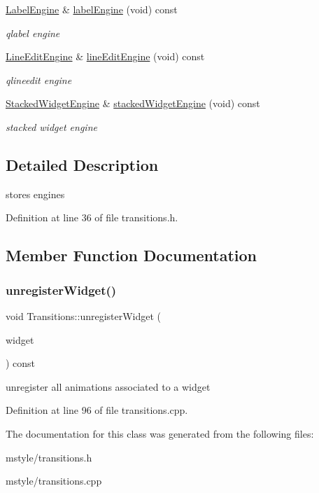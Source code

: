 \begin{DoxyCompactItemize}
\hyperlink{class_label_engine}{Label\+Engine} \& \hyperlink{class_transitions_a4b36d0bb18887994011b9ad2b3c0fbe8}{label\+Engine} (void) const
\begin{DoxyCompactList}\small\item\em qlabel engine \end{DoxyCompactList}\item 
\mbox{\label{class_transitions_a90a66821499f04f275c5bf2e0ea54f78}} 
\hyperlink{class_line_edit_engine}{Line\+Edit\+Engine} \& \hyperlink{class_transitions_a90a66821499f04f275c5bf2e0ea54f78}{line\+Edit\+Engine} (void) const
\begin{DoxyCompactList}\small\item\em qlineedit engine \end{DoxyCompactList}\item 
\mbox{\label{class_transitions_a2fc5ec8500f6851cf930e36dc45467b5}} 
\hyperlink{class_stacked_widget_engine}{Stacked\+Widget\+Engine} \& \hyperlink{class_transitions_a2fc5ec8500f6851cf930e36dc45467b5}{stacked\+Widget\+Engine} (void) const
\begin{DoxyCompactList}\small\item\em stacked widget engine \end{DoxyCompactList}\end{DoxyCompactItemize}


\subsection{Detailed Description}
stores engines 

Definition at line 36 of file transitions.\+h.



\subsection{Member Function Documentation}
\mbox{\label{class_transitions_a4bffdba4ba7227b8724a1496cc885dae}} 
\subsubsection{\texorpdfstring{unregister\+Widget()}{unregisterWidget()}}
{\footnotesize\ttfamily void Transitions\+::unregister\+Widget (\begin{DoxyParamCaption}\item[{Q\+Widget $\ast$}]{widget }\end{DoxyParamCaption}) const}

unregister all animations associated to a widget 

Definition at line 96 of file transitions.\+cpp.



The documentation for this class was generated from the following files\+:\begin{DoxyCompactItemize}
\item 
mstyle/transitions.\+h\item 
mstyle/transitions.\+cpp\end{DoxyCompactItemize}
